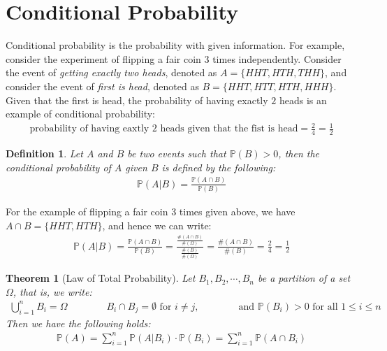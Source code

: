 \documentclass[11pt]{book}
\theoremstyle{break}
\theoremstyle{break}
\newtheorem{thm}{Theorem}[section]
\newtheorem{defn}{Definition}[corL]
\begin{document}
\newpage
\section[Conditional Probability]{\color{red} Conditional Probability\color{black}}
Conditional probability is the probability with given information. For example, consider the experiment of flipping a fair coin $3$ times independently. Consider the event of \textit{getting exactly two heads}, denoted as $A = \{HHT,HTH, THH\}$, and consider the event of \textit{first is head}, denoted as $B = \{HHT, HTT, HTH, HHH\}$. Given that the first is head, the probability of having exactly $2$ heads is an example of conditional probability:
\begin{align*}
\text{probability of having eaxtly 2 heads given that the fist is head} = \frac{2}{4} = \frac{1}{2}
\end{align*}

\begin{defn}
Let $A$ and $B$ be two events such that $\mathbb{P}(B)>0$, then the conditional probability of $A$ given $B$ is defined by the following:
\begin{align*}
\mathbb{P}(A|B) = \frac{\mathbb{P}(A\cap B)}{\mathbb{P}(B)}
\end{align*}
\end{defn}

For the example of flipping a fair coin $3$ times given above, we have $A\cap B = \{ HHT, HTH\}$, and hence we can write:
\begin{align*}
\mathbb{P}(A|B) = \frac{\mathbb{P}(A\cap B)}{\mathbb{P}(B)} = \frac{ \frac{\#(A\cap B)}{\#(\Omega)}}{\frac{\#(B)}{\#(\Omega)}} = \frac{\#(A\cap B)}{\#(B)} = \frac{2}{4} = \frac{1}{2}
\end{align*}

\begin{thm}[Law of Total Probability]
Let $B_1,B_2,\cdots, B_n$ be a partition of a set $\Omega$, that is, we write:
\begin{align*}
\bigcup_{i=1}^n B_i = \Omega \qquad\qquad B_i \cap B_j =\emptyset\text{ for }i\neq j, \qquad\qquad \text{and }\mathbb{P}(B_i) >0 \text{ for all }1\leq i \leq n
\end{align*}
Then we have the following holds:
\begin{align*}
\mathbb{P}(A) = \sum_{i=1}^n \mathbb{P}(A|B_i) \cdot \mathbb{P}(B_i) = \sum_{i=1}^n \mathbb{P}(A\cap B_i)
\end{align*}
\end{thm}
\end{document}
